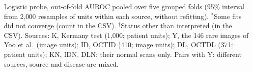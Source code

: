Logistic probe, out-of-fold AUROC pooled over five grouped folds (95\% interval from 2,000 resamples of units within each source, without refitting). $^{*}$Some fits did not converge (count in the CSV). $^{\dagger}$Status other than interpreted (in the CSV). Sources: K, Kermany test (1,000; patient units); Y, the 146 rare images of Yoo et al.\ (image units); ID, OCTID (410; image units); DL, OCTDL (371; patient units); KN, IDN, DLN: their normal scans only. Pairs with Y: different sources, source and disease are mixed.
